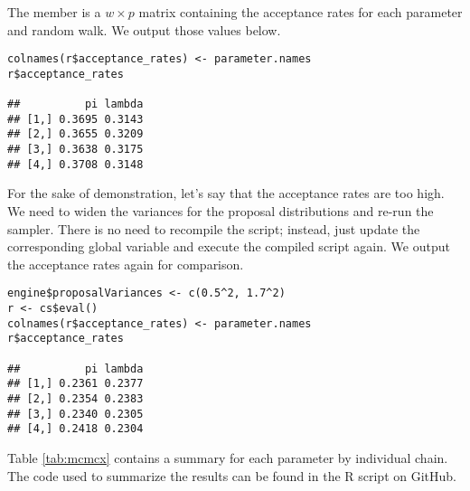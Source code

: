 The  member is a $w \times p$ matrix containing the acceptance rates for each parameter and random walk. We output those values below.

\begin{verbatim}
colnames(r$acceptance_rates) <- parameter.names
r$acceptance_rates

##          pi lambda
## [1,] 0.3695 0.3143
## [2,] 0.3655 0.3209
## [3,] 0.3638 0.3175
## [4,] 0.3708 0.3148
\end{verbatim}

For the sake of demonstration, let's say that the acceptance rates are too high. We need to widen the variances for the proposal distributions and re-run the sampler. There is no need to recompile the script; instead, just update the corresponding global variable and execute the compiled script again. We output the acceptance rates again for comparison.

\begin{verbatim}
engine$proposalVariances <- c(0.5^2, 1.7^2)
r <- cs$eval()
colnames(r$acceptance_rates) <- parameter.names
r$acceptance_rates

##          pi lambda
## [1,] 0.2361 0.2377
## [2,] 0.2354 0.2383
## [3,] 0.2340 0.2305
## [4,] 0.2418 0.2304
\end{verbatim}

Table \ref{tab:mcmcx} contains a summary for each parameter by individual chain. The code used to summarize the results can be found in the R script  on GitHub.

